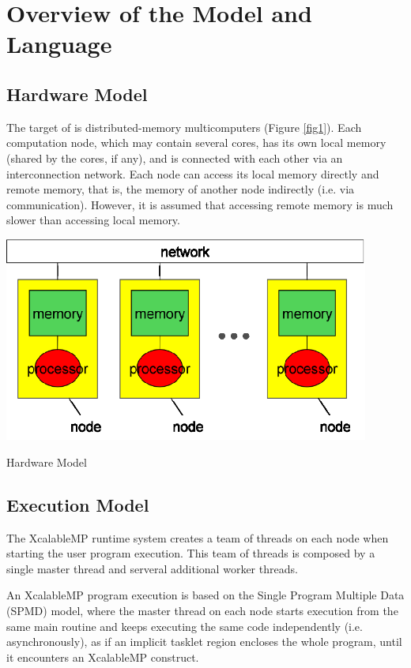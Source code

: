 \setvruler[][][][3][0][1.2\textwidth]

\setcounter{page}{1}

\chapter{Overview of the {\XMP} Model and Language}
\label{chap: overview}

\section{Hardware Model}

The target of {\XMP} is distributed-memory multicomputers (Figure
\ref{fig1}). Each computation node, which may contain several cores, has
its own local memory (shared by the cores, if any), and is connected
with each other via an interconnection network.
%
Each node can access its local memory directly and remote memory, that
is, the memory of another node indirectly (i.e. via
communication). However, it is assumed that accessing remote memory is 
much slower than accessing local memory.

\begin{myfigure}
\includegraphics[width=12cm]{figs/Fig1.eps}
  \caption{Hardware Model}\label{fig1}
\end{myfigure}

\section{Execution Model}

The XcalableMP runtime system creates a team of threads on each node
when starting the user program execution. This team of threads is
composed by a single master thread and serveral additional worker
threads.

An XcalableMP program execution is based on the Single Program
Multiple Data (SPMD) model, where the master thread on each node
starts execution from the same main routine and keeps executing the
same code independently (i.e. asynchronously), as if an implicit
tasklet region encloses the whole program, until it encounters an
XcalableMP construct.

